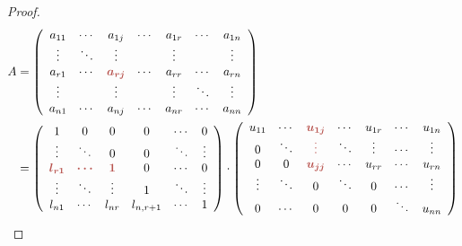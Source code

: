 \begin{proof}
    \begin{equation}
        \begin{aligned}
            A & =\left(\begin{array}{ c c c c c c c }
            a_{11} & \cdots  & a_{1j} & \cdots  & a_{1r} & \cdots  & a_{1n}\\
            \vdots  & \ddots  & \vdots  &  & \vdots  &  & \vdots \\
            a_{r1} & \cdots  & \boldsymbol{\textcolor[rgb]{0.72,0.33,0.31}{a_{rj}}} & \cdots  & a_{rr} & \cdots  & a_{rn}\\
            \vdots  &  & \vdots  &  & \vdots  & \ddots  & \vdots \\
            a_{n1} & \cdots  & a_{nj} & \cdots  & a_{nr} & \cdots  & a_{nn}
            \end{array}\right)\\
             & =\left(\begin{array}{ c c c c c c }
            1 & 0 & 0 & 0 & \cdots  & 0\\
            \vdots  & \ddots  & 0 & 0 & \ddots  & \vdots \\
            \boldsymbol{\textcolor[rgb]{0.72,0.33,0.31}{l}\textcolor[rgb]{0.72,0.33,0.31}{_{r1}}} & \boldsymbol{\textcolor[rgb]{0.72,0.33,0.31}{\cdots }} & \boldsymbol{\textcolor[rgb]{0.72,0.33,0.31}{1}} & 0 & \cdots  & 0\\
            \vdots  & \ddots  & \vdots  & 1 & \ddots  & \vdots \\
            l_{n1} & \cdots  & l_{nr} & l_{n,r+1} & \cdots  & 1
            \end{array}\right) \cdot \left(\begin{array}{ c c c c c c c }
            u_{11} & \cdots  & \boldsymbol{\textcolor[rgb]{0.72,0.33,0.31}{u_{1j}}} & \cdots  & u_{1r} & \cdots  & u_{1n}\\
            0 & \ddots  & \boldsymbol{\textcolor[rgb]{0.72,0.33,0.31}{\vdots }} & \ddots  & \vdots  & \cdots  & \vdots \\
            0 & 0 & \boldsymbol{\textcolor[rgb]{0.72,0.33,0.31}{u_{jj}}} & \cdots  & u_{rr} & \cdots  & u_{rn}\\
            \vdots  & \ddots  & 0 & \ddots  & 0 & \cdots  & \vdots \\
            0 & \cdots  & 0 & 0 & 0 & \ddots  & u_{nn}
            \end{array}\right)
            \end{aligned}
    \end{equation}
\end{proof}

